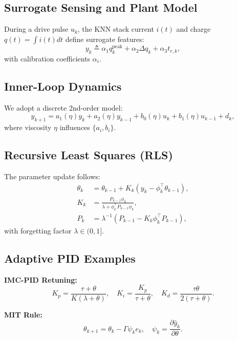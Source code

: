 \subsection{Surrogate Sensing and Plant Model}
During a drive pulse $u_k$, the KNN stack current $i(t)$ and 
charge $q(t)=\int i(t) dt$ define surrogate features:
\begin{equation}
y_k \triangleq \alpha_1 q_k^{\text{peak}} + \alpha_2 \Delta q_k + \alpha_3 t_{r,k},
\end{equation}
with calibration coefficients $\alpha_i$.

\subsection{Inner-Loop Dynamics}
We adopt a discrete 2nd-order model:
\begin{equation}
y_{k+1} = a_1(\eta) y_k + a_2(\eta) y_{k-1} + b_0(\eta) u_k + b_1(\eta) u_{k-1} + d_k,
\end{equation}
where viscosity $\eta$ influences $\{a_i, b_i\}$.

\subsection{Recursive Least Squares (RLS)}
The parameter update follows:
\begin{align}
\theta_k &= \theta_{k-1} + K_k (y_k - \phi_k^\top \theta_{k-1}), \\
K_k &= \frac{P_{k-1}\phi_k}{\lambda + \phi_k^\top P_{k-1}\phi_k}, \\
P_k &= \lambda^{-1}(P_{k-1} - K_k \phi_k^\top P_{k-1}),
\end{align}
with forgetting factor $\lambda \in (0,1]$.

\subsection{Adaptive PID Examples}
\textbf{IMC-PID Retuning:}
\begin{equation}
K_p = \frac{\tau + \theta}{K(\lambda + \theta)}, \quad 
K_i = \frac{K_p}{\tau + \theta}, \quad 
K_d = \frac{\tau\theta}{2(\tau + \theta)}.
\end{equation}

\textbf{MIT Rule:}
\begin{equation}
\theta_{k+1} = \theta_k - \Gamma \psi_k e_k, \quad 
\psi_k = \frac{\partial \hat{y}_k}{\partial \theta}.
\end{equation}
